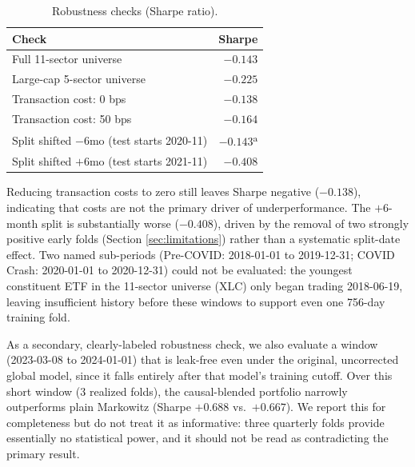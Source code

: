 \documentclass[10pt,twocolumn]{article}
\begin{document}
\begin{table}[h]
\centering
\small
\caption{Robustness checks (Sharpe ratio).}
\label{tab:robustness}
\begin{tabular}{lr}
\toprule
Check & Sharpe \\
\midrule
Full 11-sector universe & $-0.143$ \\
Large-cap 5-sector universe & $-0.225$ \\
Transaction cost: 0 bps & $-0.138$ \\
Transaction cost: 50 bps & $-0.164$ \\
Split shifted $-6$mo (test starts 2020-11) & $-0.143$\textsuperscript{a} \\
Split shifted $+6$mo (test starts 2021-11) & $-0.408$ \\
\bottomrule
\end{tabular}
\end{table}
\vspace{-0.5em}

Reducing transaction costs to zero still leaves Sharpe negative
($-0.138$), indicating that costs are not the primary driver of
underperformance. The $+6$-month split is substantially worse
($-0.408$), driven by the removal of two strongly positive early folds
(Section \ref{sec:limitations}) rather than a systematic split-date
effect. Two named sub-periods (Pre-COVID: 2018-01-01 to 2019-12-31;
COVID Crash: 2020-01-01 to 2020-12-31) could not be evaluated: the
youngest constituent ETF in the 11-sector universe (XLC) only began
trading 2018-06-19, leaving insufficient history before these windows to
support even one 756-day training fold.

As a secondary, clearly-labeled robustness check, we also evaluate a
window (2023-03-08 to 2024-01-01) that is leak-free even under the
original, uncorrected global model, since it falls entirely after that
model's training cutoff. Over this short window (3 realized folds), the
causal-blended portfolio narrowly outperforms plain Markowitz (Sharpe
$+0.688$ vs.\ $+0.667$). We report this for completeness but do not treat
it as informative: three quarterly folds provide essentially no
statistical power, and it should not be read as contradicting the
primary result.
\end{document}
